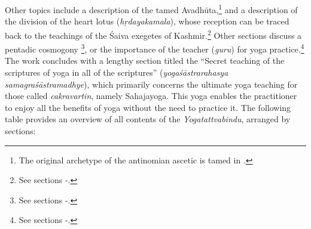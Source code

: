 Other topics include a description of the tamed Avadhūta,\footnote{The original archetype of the antinomian ascetic is tamed in .} and a description of the division of the heart lotus (\textit{hṛdayakamala}), whose reception can be traced back to the teachings of the Śaiva exegetes of Kashmir.\footnote{See sections -.} Other sections discuss a pentadic cosmogony \footnote{See sections -.}, or the importance of the teacher (\textit{guru}) for yoga practice.\footnote{See sections -.} The work concludes with a lengthy section titled the ``Secret teaching of the scriptures of yoga in all of the scriptures'' (\textit{yogaśāstrarahasya samagraśāstramadhye}), which primarily concerns the ultimate yoga teaching for those called \textit{cakravartin}, namely Sahajayoga. This yoga enables the practitioner to enjoy all the benefits of yoga without the need to practice it. The following table provides an overview of all contents of the \emph{Yogatattvabindu}, arranged by sections:

